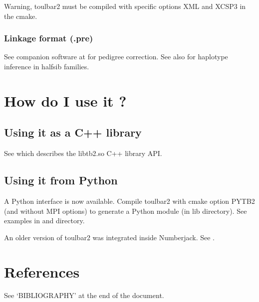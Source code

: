 \documentclass[letterpaper,10pt,openany,oneside,english]{sphinxmanual}
\begin{document}
\sphinxAtStartPar
Warning, toulbar2 must be compiled with specific options XML and XCSP3 in the cmake.

\sphinxstepscope


\subsubsection{Linkage format (.pre)}
\label{\detokenize{formats/preformat:linkage-format-pre}}\label{\detokenize{formats/preformat:pre-format}}\label{\detokenize{formats/preformat::doc}}
\sphinxAtStartPar
See  companion software at  for pedigree correction. See also  for haplotype inference in half\sphinxhyphen{}sib families.


\section{How do I use it ?}
\label{\detokenize{userdoc:how-do-i-use-it}}

\subsection{Using it as a C++ library}
\label{\detokenize{userdoc:using-it-as-a-c-library}}
\sphinxAtStartPar
See {\hyperref[\detokenize{refman:refman}]{}} which describes the libtb2.so C++ library API.


\subsection{Using it from Python}
\label{\detokenize{userdoc:using-it-from-python}}
\sphinxAtStartPar
A Python interface is now available. Compile toulbar2 with cmake option PYTB2 (and without MPI options) to generate a Python module  (in lib directory). See examples in 
and  directory.

\sphinxAtStartPar
An older version of toulbar2 was integrated inside Numberjack. See .


\section{References}
\label{\detokenize{userdoc:references}}
\sphinxAtStartPar
See ‘BIBLIOGRAPHY’ at the end of the document.
\end{document}
